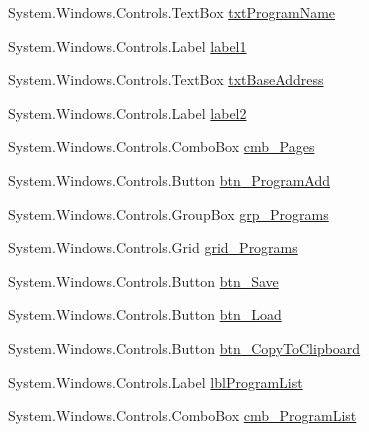 \begin{DoxyCompactItemize}
\item 
System.\+Windows.\+Controls.\+Text\+Box \hyperlink{class_c_p_u___o_s___simulator_1_1_main_window_a2c64b45db8c1d7a30c2f9155899cf918}{txt\+Program\+Name}
\item 
System.\+Windows.\+Controls.\+Label \hyperlink{class_c_p_u___o_s___simulator_1_1_main_window_a09b3ba374a620331bc447b32959260c2}{label1}
\item 
System.\+Windows.\+Controls.\+Text\+Box \hyperlink{class_c_p_u___o_s___simulator_1_1_main_window_aa6eeef1bfdd74aa90d6fea68987306ad}{txt\+Base\+Address}
\item 
System.\+Windows.\+Controls.\+Label \hyperlink{class_c_p_u___o_s___simulator_1_1_main_window_a88c7b6748a5e198c673a3c3c5178d3b8}{label2}
\item 
System.\+Windows.\+Controls.\+Combo\+Box \hyperlink{class_c_p_u___o_s___simulator_1_1_main_window_a8da421354f40baef03909c87c3407e3c}{cmb\+\_\+\+Pages}
\item 
System.\+Windows.\+Controls.\+Button \hyperlink{class_c_p_u___o_s___simulator_1_1_main_window_a4f0d9f8f3d56b76616367438d04b4fde}{btn\+\_\+\+Program\+Add}
\item 
System.\+Windows.\+Controls.\+Group\+Box \hyperlink{class_c_p_u___o_s___simulator_1_1_main_window_a2cafe5a8b54ae3e95a770abc594519a0}{grp\+\_\+\+Programs}
\item 
System.\+Windows.\+Controls.\+Grid \hyperlink{class_c_p_u___o_s___simulator_1_1_main_window_a7a4cb93db4cde3b227cbc3155af574d2}{grid\+\_\+\+Programs}
\item 
System.\+Windows.\+Controls.\+Button \hyperlink{class_c_p_u___o_s___simulator_1_1_main_window_a638eee3b21f6ac5d28a5c95c4dad3fc2}{btn\+\_\+\+Save}
\item 
System.\+Windows.\+Controls.\+Button \hyperlink{class_c_p_u___o_s___simulator_1_1_main_window_a29fbdb7afddedc9425472096337ee13b}{btn\+\_\+\+Load}
\item 
System.\+Windows.\+Controls.\+Button \hyperlink{class_c_p_u___o_s___simulator_1_1_main_window_ad56a38e017d6d47d2076b1ec33e3521d}{btn\+\_\+\+Copy\+To\+Clipboard}
\item 
System.\+Windows.\+Controls.\+Label \hyperlink{class_c_p_u___o_s___simulator_1_1_main_window_a9cbfc378965cf635e61c760e11dd5c8a}{lbl\+Program\+List}
\item 
System.\+Windows.\+Controls.\+Combo\+Box \hyperlink{class_c_p_u___o_s___simulator_1_1_main_window_a9871f5933923725d4386a7a7f3f8828f}{cmb\+\_\+\+Program\+List}
\item 

\end{DoxyCompactItemize}
